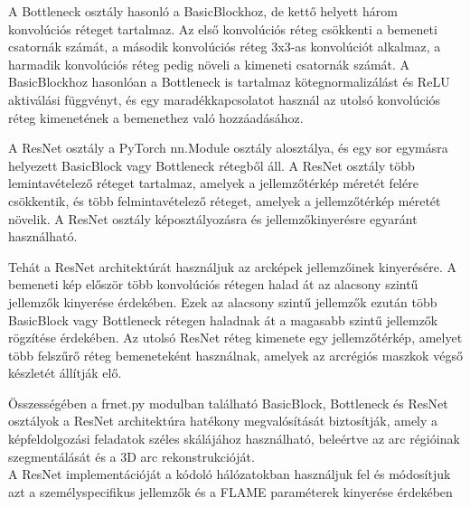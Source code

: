 \documentclass[12pt,a4]{article}
\begin{document}
            A Bottleneck osztály hasonló a BasicBlockhoz, de kettő helyett három konvolúciós réteget tartalmaz.
            Az első konvolúciós réteg csökkenti a bemeneti csatornák számát, a második konvolúciós réteg 3x3-as konvolúciót alkalmaz, a harmadik konvolúciós réteg pedig növeli a kimeneti csatornák számát.
            A BasicBlockhoz hasonlóan a Bottleneck is tartalmaz kötegnormalizálást és ReLU aktiválási függvényt, és egy maradékkapcsolatot használ az utolsó konvolúciós réteg kimenetének a bemenethez való hozzáadásához.
            
            A ResNet osztály a PyTorch nn.Module osztály alosztálya, és egy sor egymásra helyezett BasicBlock vagy Bottleneck rétegből áll.
            A ResNet osztály több lemintavételező réteget tartalmaz, amelyek a jellemzőtérkép méretét felére csökkentik, és több felmintavételező réteget, amelyek a jellemzőtérkép méretét növelik.
            A ResNet osztály képosztályozásra és jellemzőkinyerésre egyaránt használható.
             
            Tehát a ResNet architektúrát használjuk az arcképek jellemzőinek kinyerésére. A bemeneti kép először több konvolúciós rétegen halad át az alacsony szintű jellemzők kinyerése érdekében.
            Ezek az alacsony szintű jellemzők ezután több BasicBlock vagy Bottleneck rétegen haladnak át a magasabb szintű jellemzők rögzítése érdekében. 
            Az utolsó ResNet réteg kimenete egy jellemzőtérkép, amelyet több felszűrő réteg bemeneteként használnak, amelyek az arcrégiós maszkok végső készletét állítják elő.
            
            Összességében a frnet.py modulban található BasicBlock, Bottleneck és ResNet osztályok a ResNet architektúra hatékony megvalósítását biztosítják, 
            amely a képfeldolgozási feladatok széles skálájához használható, beleértve az arc régióinak szegmentálását és a 3D arc rekonstrukcióját. \\

            A ResNet implementációját a kódoló hálózatokban használjuk fel és módosítjuk azt a személyspecifikus jellemzők és a FLAME paraméterek kinyerése érdekében
                     
\end{document}
